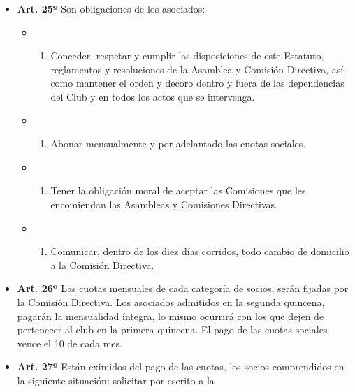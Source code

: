 \documentclass[]{book}
\providecommand{\tightlist}{%
  \setlength{\itemsep}{0pt}\setlength{\parskip}{0pt}}
\begin{document}
\begin{itemize}
\item
  \textbf{Art. 25º} Son obligaciones de los asociados:

  \begin{itemize}
  \item
    \begin{enumerate}
    \def\labelenumi{\alph{enumi})}
    \tightlist
    \item
      Conceder, respetar y cumplir las disposiciones de este Estatuto,
      reglamentos y resoluciones de la Asamblea y Comisión Directiva,
      así como mantener el orden y decoro dentro y fuera de las
      dependencias del Club y en todos los actos que se intervenga.
    \end{enumerate}
  \item
    \begin{enumerate}
    \def\labelenumi{\alph{enumi})}
    \setcounter{enumi}{1}
    \tightlist
    \item
      Abonar mensualmente y por adelantado las cuotas sociales.
    \end{enumerate}
  \item
    \begin{enumerate}
    \def\labelenumi{\alph{enumi})}
    \setcounter{enumi}{2}
    \tightlist
    \item
      Tener la obligación moral de aceptar las Comisiones que les
      encomiendan las Asambleas y Comisiones Directivas.
    \end{enumerate}
  \item
    \begin{enumerate}
    \def\labelenumi{\alph{enumi})}
    \setcounter{enumi}{3}
    \tightlist
    \item
      Comunicar, dentro de los diez días corridos, todo cambio de
      domicilio a la Comisión Directiva.
    \end{enumerate}
  \end{itemize}
\item
  \textbf{Art. 26º} Las cuotas mensuales de cada categoría de socios,
  serán fijadas por la Comisión Directiva. Los asociados admitidos en la
  segunda quincena, pagarán la mensualidad íntegra, lo mismo ocurrirá
  con los que dejen de pertenecer al club en la primera quincena. El
  pago de las cuotas sociales vence el 10 de cada mes.
\item
  \textbf{Art. 27º} Están eximidos del pago de las cuotas, los socios
  comprendidos en la siguiente situación: solicitar por escrito a la

\end{itemize}
\end{document}
